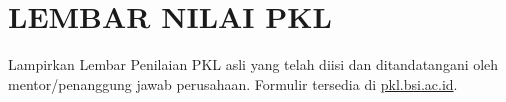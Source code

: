 \clearpage
\chapter*{LEMBAR NILAI PKL}
\label{lamp:lembar-bimbingan}

Lampirkan Lembar Penilaian PKL asli yang telah diisi dan ditandatangani oleh mentor/penanggung jawab perusahaan. Formulir tersedia di \href{http://pkl.bsi.ac.id}{pkl.bsi.ac.id}.

\begin{center}
\end{center}

